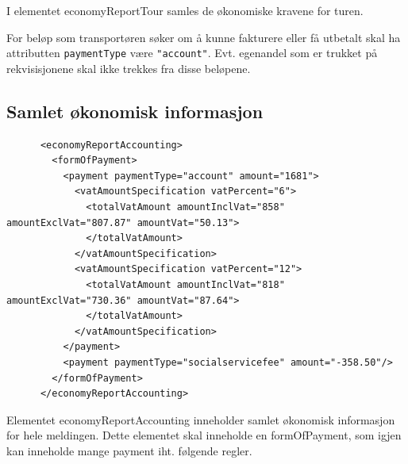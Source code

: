 \documentclass[a4paper,titlepage,norsk,11pt]{article}
\begin{document}
I elementet economyReportTour samles de økonomiske kravene for turen.

For beløp som transportøren søker om å kunne fakturere eller få utbetalt skal ha attributten \lstinline{paymentType} være \lstinline{"account"}. Evt. egenandel som er trukket på rekvisisjonene skal ikke trekkes fra disse beløpene.

\subsection{Samlet økonomisk informasjon}

\begin{lstlisting}
      <economyReportAccounting>
        <formOfPayment>
          <payment paymentType="account" amount="1681">
            <vatAmountSpecification vatPercent="6">
              <totalVatAmount amountInclVat="858" amountExclVat="807.87" amountVat="50.13">
              </totalVatAmount>
            </vatAmountSpecification>
            <vatAmountSpecification vatPercent="12">
              <totalVatAmount amountInclVat="818" amountExclVat="730.36" amountVat="87.64">
              </totalVatAmount>
            </vatAmountSpecification>
          </payment>
          <payment paymentType="socialservicefee" amount="-358.50"/>
        </formOfPayment>
      </economyReportAccounting>
\end{lstlisting}

Elementet economyReportAccounting inneholder samlet økonomisk informasjon for hele meldingen. Dette elementet skal inneholde en formOfPayment, som igjen kan inneholde mange payment iht. følgende regler.
\end{document}
